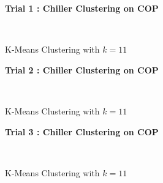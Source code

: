 \begin{figure}[!h]
\centerline{\bfseries\Large Trial 1 : Chiller Clustering on COP}\\
\caption{K-Means Clustering with $k=11$}
\end{figure}
\begin{figure}[!h]
\centerline{\bfseries\Large Trial 2 : Chiller Clustering on COP}\\
\caption{K-Means Clustering with $k=11$}
\end{figure}
\begin{figure}[!h]
\centerline{\bfseries\Large Trial 3 : Chiller Clustering on COP}\\
\caption{K-Means Clustering with $k=11$}
\end{figure}
